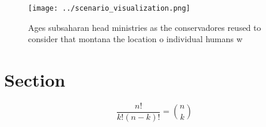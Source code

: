 \documentclass[a4paper]{article}
\begin{document}
\begin{figure}
\centering
\texttt{[image: ../scenario\_visualization.png]}
\caption{Ages subsaharan head ministries as the conservadores reused to consider that montana the location o individual humans w
}
\end{figure}
 
\section{Section}

\[ \frac{n!}{k!(n-k)!} = \binom{n}{k} \]
\end{document}
